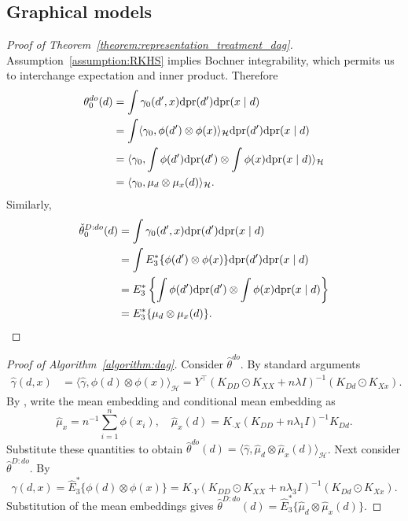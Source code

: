 \subsection{Graphical models}

\begin{proof}[Proof of Theorem~\ref{theorem:representation_treatment_dag}]
Assumption~\ref{assumption:RKHS} implies Bochner integrability, which permits us to interchange expectation and inner product. Therefore
\begin{align*}
    \theta_0^{do}(d)&=\int \gamma_0(d',x)\mathrm{d}\text{\normalfont pr}(d')\mathrm{d}\text{\normalfont pr}(x \mid d)  \\
    &=\int \langle \gamma_0,\phi(d')\otimes \phi(x) \rangle_{\mathcal{H}} \mathrm{d}\text{\normalfont pr}(d')\mathrm{d}\text{\normalfont pr}(x \mid d) \\
    &=\langle \gamma_0,\int \phi(d')\mathrm{d}\text{\normalfont pr}(d') \otimes \int \phi(x)\mathrm{d}\text{\normalfont pr}(x \mid d) \rangle_{\mathcal{H}}  \\
    &= \langle \gamma_0,\mu_d \otimes \mu_x(d) \rangle_{\mathcal{H}}.
\end{align*}
Similarly,  
\begin{align*}
    \check{\theta}_0^{D:do}(d)&=\int \gamma_0(d',x)\mathrm{d}\text{\normalfont pr}(d')\mathrm{d}\text{\normalfont pr}(x \mid d)  \\
    &=\int E_3^*\{\phi(d')\otimes \phi(x)\} \mathrm{d}\text{\normalfont pr}(d')\mathrm{d}\text{\normalfont pr}(x \mid d) \\
    &=E_3^*\left\{\int \phi(d')\mathrm{d}\text{\normalfont pr}(d') \otimes \int \phi(x)\mathrm{d}\text{\normalfont pr}(x \mid d) \right\}  \\
    &= E_3^*\{\mu_d \otimes \mu_x(d)\}.
\end{align*}
\end{proof}

\begin{proof}[Proof of Algorithm~\ref{algorithm:dag}]
Consider $\hat{\theta}^{do}$. By standard arguments \cite{kimeldorf1971some}
\begin{align*}
\hat{\gamma}(d,x)&=
\langle \hat{\gamma}, \phi(d)\otimes \phi(x) \rangle_{\mathcal{H}}=Y^{\top}(K_{DD}\odot K_{XX}+n\lambda I )^{-1}(K_{Dd}\odot K_{Xx}).  
\end{align*}
By \cite[Algorithm 1]{singh2019kernel}, write the mean embedding and conditional mean embedding as
  $$
  \hat{\mu}_x=n^{-1}\sum_{i=1}^n \phi(x_i),\quad \hat{\mu}_x(d)=K_{\cdot X}(K_{DD}+n\lambda_1 I )^{-1}K_{Dd}.
  $$
    Substitute these quantities to obtain
    $
    \hat{\theta}^{do}(d)=\langle \hat{\gamma}, \hat{\mu}_d\otimes \hat{\mu}_x(d)\rangle_{\mathcal{H}}
    $. 
    Next consider $\hat{\theta}^{D:do}$. By \cite[Algorithm 1]{singh2019kernel}
$$
\hat{\gamma}(d,x)=\hat{E}_3^*\{\phi(d)\otimes \phi(x)\}=K_{\cdot Y}(K_{DD}\odot K_{XX}+n\lambda_3 I )^{-1}(K_{Dd}\odot K_{Xx}).
$$
Substitution of the mean embeddings gives
    $
    \hat{\theta}^{D:do}(d)=\hat{E}_3^* \{\hat{\mu}_d\otimes \hat{\mu}_x(d)\}
    $. 
\end{proof}